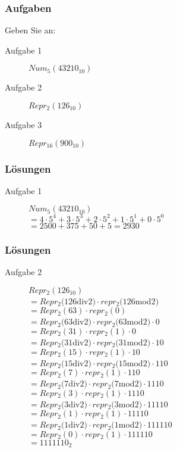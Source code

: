 \documentclass{beamer}
\begin{document}
	\begin{frame}
		\frametitle{Aufgaben}
		Geben Sie an:
		\begin{description}
			\item[Aufgabe 1] $Num_{5}(43210_{10})$
			\item[Aufgabe 2] $Repr_{2}(126_{10})$
			\item[Aufgabe 3] $Repr_{16}(900_{10})$
		\end{description}
	\end{frame}
	\begin{frame}
		\frametitle{Lösungen}
		\small
		\begin{description}
			\item[Aufgabe 1] $Num_{5}(43210_{10})$\\
				\pause
				$=4\cdot 5^{4}+3\cdot 5^{3}+2\cdot 5^{2}+1\cdot 5^{1}+0\cdot 5^{0}$\\
				\pause
				$=2500+375+50+5=2930$
		\end{description}
	\end{frame}
	\begin{frame}
		\frametitle{Lösungen}
		\small
		\begin{description}
			\item[Aufgabe 2] $Repr_{2}(126_{10})$\\
				\pause
				$=Repr_{2}(126$div$2)\cdot repr_{2}(126$mod$2)$\\
				\pause
				$=Repr_{2}(63)\cdot repr_{2}(0)$\\
				\pause
				$=Repr_{2}(63$div$2)\cdot repr_{2}(63$mod$2)\cdot 0$\\
				\pause
				$=Repr_{2}(31)\cdot repr_{2}(1)\cdot 0$\\
				\pause
				$=Repr_{2}(31$div$2)\cdot repr_{2}(31$mod$2)\cdot 10$\\
				\pause
				$=Repr_{2}(15)\cdot repr_{2}(1)\cdot 10$\\
				\pause
				$=Repr_{2}(15$div$2)\cdot repr_{2}(15$mod$2)\cdot 110$\\
				\pause
				$=Repr_{2}(7)\cdot repr_{2}(1)\cdot 110$\\
				\pause
				$=Repr_{2}(7$div$2)\cdot repr_{2}(7$mod$2)\cdot 1110$\\
				\pause
				$=Repr_{2}(3)\cdot repr_{2}(1)\cdot 1110$\\
				\pause
				$=Repr_{2}(3$div$2)\cdot repr_{2}(3$mod$2)\cdot 11110$\\
				\pause
				$=Repr_{2}(1)\cdot repr_{2}(1)\cdot 11110$\\
				\pause
				$=Repr_{2}(1$div$2)\cdot repr_{2}(1$mod$2)\cdot 111110$\\
				\pause
				$=Repr_{2}(0)\cdot repr_{2}(1)\cdot 111110$\\
				\pause
				$=1111110_{2}$\\
		\end{description}
	\end{frame}
\end{document}
